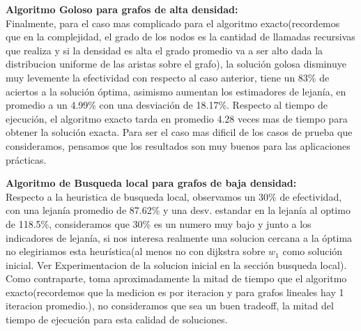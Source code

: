 \textbf{Algoritmo Goloso para grafos de alta densidad:}\\
Finalmente, para el caso mas complicado para el algoritmo exacto(recordemos que en la complejidad, el grado de los nodos es la cantidad de llamadas recursivas que realiza y si la densidad es alta el grado promedio va a ser alto dada la distribucion uniforme de las aristas sobre el grafo), la soluci\'on golosa disminuye muy levemente la efectividad con respecto al caso anterior, tiene un 83\% de aciertos a la soluci\'on \'optima, asimismo aumentan los estimadores de lejan\'ia, en promedio a un 4.99\% con una desviaci\'on de 18.17\%. Respecto al tiempo de ejecuci\'on, el algoritmo exacto tarda en promedio 4.28 veces mas de tiempo para obtener la soluci\'on exacta. Para ser el caso mas dificil de los casos de prueba que consideramos, pensamos que los resultados son muy buenos para las aplicaciones pr\'acticas.

\vspace{0.5cm}

\textbf{Algoritmo de Busqueda local para grafos de baja densidad:}\\
Respecto a la heuristica de busqueda local, observamos un 30\% de efectividad, con una lejan\'ia promedio de 87.62\% y una desv. estandar en la lejan\'ia al optimo de 118.5\%, consideramos que 30\% es un numero muy bajo y junto a los indicadores de lejan\'ia, si nos interesa realmente una solucion cercana a la \'optima no elegiriamos esta heur\'istica(al menos no con dijkstra sobre $w_1$ como soluci\'on inicial. Ver Experimentacion de la solucion inicial en la secci\'on busqueda local). Como contraparte, toma aproximadamente la mitad de tiempo que el algoritmo exacto(recordemos que la medicion es por iteracion y para grafos lineales hay 1 iteracion promedio.), no consideramos que sea un buen tradeoff, la mitad del tiempo de ejecuci\'on para esta calidad de soluciones.\\

\vspace{0.5cm}

